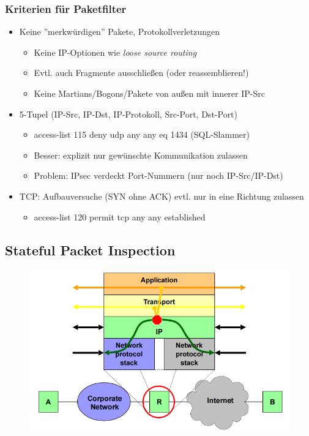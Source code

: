 \documentclass[openany]{book}
\begin{document}
\subsubsection{Kriterien für Paketfilter}

\begin{itemize}
    \item Keine ''merkwürdigen'' Pakete, Protokollverletzungen
    \begin{itemize}
        \item Keine IP-Optionen wie \textit{loose source routing}
        \item Evtl. auch Fragmente ausschließen (oder reassemblieren!)
        \item Keine Martians/Bogons/Pakete von außen mit innerer IP-Src
    \end{itemize}
    \item 5-Tupel (IP-Src, IP-Dst, IP-Protokoll, Src-Port, Dst-Port)
    \begin{itemize}
        \item access-list 115 deny udp any any eq 1434 (SQL-Slammer)
        \item Besser: explizit nur gewünschte Kommunikation zulassen
        \item Problem: IPsec verdeckt Port-Nummern (nur noch IP-Src/IP-Dst)
    \end{itemize}
    \item TCP: Aufbauversuche (SYN ohne ACK) evtl. nur in eine Richtung zulassen
    \begin{itemize}
        \item access-list 120 permit tcp any any established
    \end{itemize}
\end{itemize}

\subsection{Stateful Packet Inspection}

\begin{figure}[h!]
    \centering
    \includegraphics[width=0.85\linewidth]{Pics/PacketInspection.PNG}
\end{figure}
\end{document}

